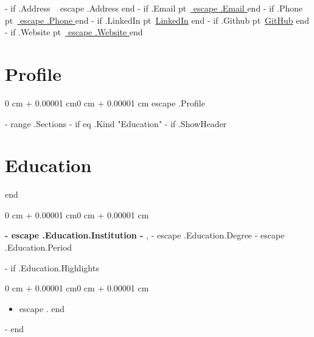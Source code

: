 \documentclass[10pt, letterpaper]{article}
\newenvironment{highlights}{\begin{itemize}[topsep=0.10 cm,parsep=0.10 cm,partopsep=0pt,itemsep=0pt,leftmargin=0 cm + 10pt]}{\end{itemize}}
\newenvironment{onecolentry}{\begin{adjustwidth}{0 cm + 0.00001 cm}{0 cm + 0.00001 cm}}{\end{adjustwidth}}
\newenvironment{twocolentry}[2][]{\onecolentry\def\secondColumn{#2}\setcolumnwidth{\fill, 4.5 cm}\begin{paracol}{2}}{\switchcolumn \raggedleft \secondColumn\end{paracol}\endonecolentry}
\newenvironment{header}{\setlength{\topsep}{0pt}\par\kern\topsep\centering\linespread{1.5}}{\par\kern\topsep}
\begin{document}
    \newcommand{\AND}{\unskip\cleaders\copy\ANDbox\hskip\wd\ANDbox\ignorespaces}
    \newsavebox\ANDbox\sbox\ANDbox{$|$}

    \begin{header}
        \fontsize{25 pt}{25 pt}

        \vspace{5 pt}

        \normalsize
        {{- if .Address }}\mbox{\faGlobe}\ {{ escape .Address }}{{ end }}
        {{- if .Email }} pt\mbox{\faEnvelope}\ {\href{mailto:{{ .Email }}}{ {{ escape .Email }} }}{{ end }}
        {{- if .Phone }} pt\mbox{\faPhone}\ {\href{tel:{{ .Phone }}}{ {{ escape .Phone }} }}{{ end }}
        {{- if .LinkedIn }} pt\mbox{\faLinkedin}\ {\href{ {{ .LinkedIn }} }{LinkedIn}}{{ end }}
        {{- if .Github }} pt\mbox{\faGithub}\ {\href{ {{ .Github }} }{GitHub}}{{ end }}
        {{- if .Website }} pt\mbox{\faGlobe}\ {\href{ {{ .Website }} }{ {{ escape .Website }} }}{{ end }}
    \end{header}

    \vspace{5 pt - 0.3 cm}

    \section{Profile}
        \begin{onecolentry}
            {{ escape .Profile }}
        \end{onecolentry}

    {{- range .Sections }}
        {{- if eq .Kind "Education" }}
            {{- if .ShowHeader }}\section{Education}{{ end }}
            \begin{twocolentry}{
                {{ escape .Education.Period }}
            }
                \textbf{ {{- escape .Education.Institution -}} }, {{- escape .Education.Degree -}}\end{twocolentry}
            \vspace{0.10 cm}
            {{- if .Education.Highlights }}\begin{onecolentry}\begin{highlights}{{ range .Education.Highlights }}\item {{ escape . }}{{ end }}\end{highlights}\end{onecolentry}{{ end }}
        {{- end }}
\end{document}
